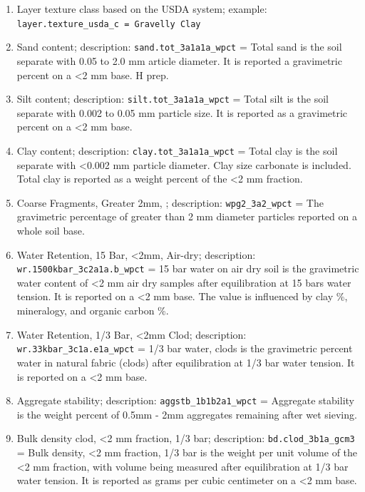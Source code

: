 \documentclass[
  graybox,natbib,nospthms]{svmono}
\begin{document}
\begin{enumerate}
\item
  Layer texture class based on the USDA system; example: \texttt{layer.texture\_usda\_c\ =\ \textquotesingle{}Gravelly\ Clay\textquotesingle{}}\\
\item
  Sand content; description: \texttt{sand.tot\_3a1a1a\_wpct} = Total sand is the soil separate with 0.05 to 2.0 mm article diameter. It is reported a gravimetric percent on a \textless2 mm base. H prep.\\
\item
  Silt content; description: \texttt{silt.tot\_3a1a1a\_wpct} = Total silt is the soil separate with 0.002 to 0.05 mm particle size. It is reported as a gravimetric percent on a \textless2 mm base.\\
\item
  Clay content; description: \texttt{clay.tot\_3a1a1a\_wpct} = Total clay is the soil separate with \textless0.002 mm particle diameter. Clay size carbonate is included. Total clay is reported as a weight percent of the \textless2 mm fraction.\\
\item
  Coarse Fragments, Greater 2mm, ; description: \texttt{wpg2\_3a2\_wpct} = The gravimetric percentage of greater than 2 mm diameter particles reported on a whole soil base.\\
\item
  Water Retention, 15 Bar, \textless2mm, Air-dry; description: \texttt{wr.1500kbar\_3c2a1a.b\_wpct} = 15 bar water on air dry soil is the gravimetric water content of \textless2 mm air dry samples after equilibration at 15 bars water tension. It is reported on a \textless2 mm base. The value is influenced by clay \%, mineralogy, and organic carbon \%.\\
\item
  Water Retention, 1/3 Bar, \textless2mm Clod; description: \texttt{wr.33kbar\_3c1a.e1a\_wpct} = 1/3 bar water, clods is the gravimetric percent water in natural fabric (clods) after equilibration at 1/3 bar water tension. It is reported on a \textless2 mm base.\\
\item
  Aggregate stability; description: \texttt{aggstb\_1b1b2a1\_wpct} = Aggregate stability is the weight percent of 0.5mm - 2mm aggregates remaining after wet sieving.
\item
  Bulk density clod, \textless2 mm fraction, 1/3 bar; description: \texttt{bd.clod\_3b1a\_gcm3} = Bulk density, \textless2 mm fraction, 1/3 bar is the weight per unit volume of the \textless2 mm fraction, with volume being measured after equilibration at 1/3 bar water tension. It is reported as grams per cubic centimeter on a \textless2 mm base.\\

\end{enumerate}
\end{document}
